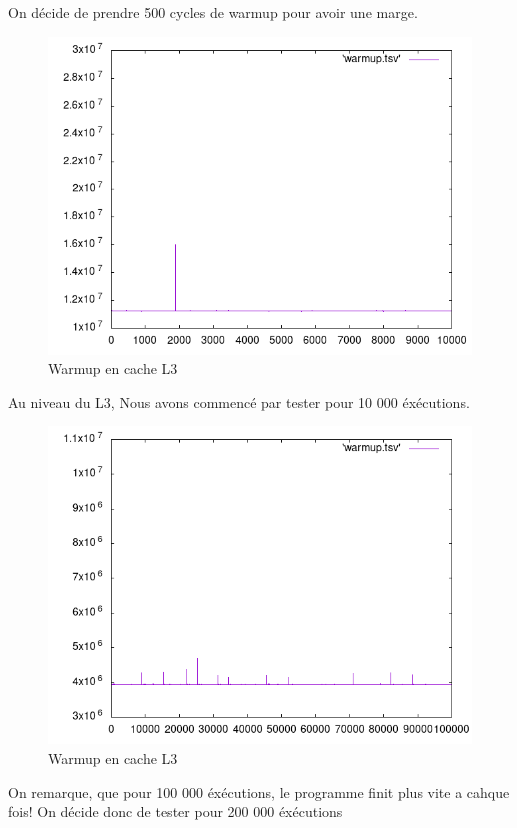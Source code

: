 \documentclass{report}
\begin{document}
    On décide de prendre 500 cycles de warmup pour avoir une marge.

\newpage 
    \begin{figure}[ht!]
        \centering
        \includegraphics[width=120mm]{MEDIA/warmupL3_NOCstate.png}
        \caption{Warmup en cache L3}
    \end{figure}

Au niveau du L3, Nous avons commencé par tester pour 10 000 éxécutions. 

\newpage 
    \begin{figure}[ht!]
        \centering
        \includegraphics[width=120mm]{MEDIA/warmupL3_100000.png}
        \caption{Warmup en cache L3 }
    \end{figure}

On remarque, que pour 100 000 éxécutions, le programme finit plus vite a cahque fois!
On décide donc de tester pour 200 000 éxécutions 
\end{document}
